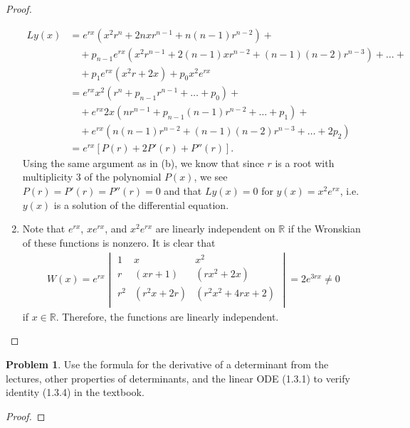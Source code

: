 \documentclass[12pt]{article}
\theoremstyle{definition}
\newtheorem{problem}{Problem}
\begin{document}
\begin{proof}
\begin{enumerate}
\begin{align*}
        Ly(x) &= e^{rx}\left(x^2r^n + 2nxr^{n-1} + n(n-1)r^{n-2}\right) +\\
        &\quad+ p_{n-1}e^{rx}\left(x^2r^{n-1} + 2(n-1)xr^{n-2} + (n-1)(n-2)r^{n-3}\right) + \dots +\\
        &\quad+ p_1 e^{rx}(x^2r+2x) + p_0 x^2e^{rx} \\
        &= e^{rx}x^2(r^n + p_{n-1}r^{n-1} +\dots + p_0) + \\
        &\quad + e^{rx}2x(nr^{n-1} + p_{n-1}(n-1)r^{n-2} + \dots + p_1) + \\
        &\quad + e^{rx}(n(n-1)r^{n-2} + (n-1)(n-2)r^{n-3} + \dots + 2p_2) \\
        &= e^{rx}\left[P(r) + 2P'(r) + P''(r)\right].
      \end{align*}
      Using the same argument as in (b), we know that
      since $r$ is a root with multiplicity 3 of the polynomial $P(x)$, we
      see $P(r) = P'(r) = P''(r) = 0$ and that $Ly(x) = 0$ for $y(x) = x^2e^{rx}$, i.e.\
      $y(x)$ is a solution of the differential equation.
    \item Note that $e^{rx}$, $xe^{rx}$, and $x^2 e^{rx}$
      are linearly independent on $\mathbb{R}$ if the Wronskian of these functions is nonzero. It is clear that
      \begin{align*}
        W(x) =
        e^{rx}
        \begin{vmatrix}
          1 & x & x^2  \\
          r & (xr + 1) &  (rx^2 + 2x) \\
          r^2 & (r^2x + 2r) & (r^2x^2 + 4rx + 2)  \\
        \end{vmatrix} = 2e^{3rx} \neq 0
      \end{align*}
      if $x \in \mathbb{R}$. Therefore, the functions are linearly independent.
  \end{enumerate}
\end{proof}
\newpage


\begin{problem}
  Use the formula for the derivative of a determinant from the lectures, other
  properties of determinants, and the linear ODE (1.3.1) to verify identity
  (1.3.4) in the textbook.
\end{problem}

\begin{proof}
\end{proof}
\end{document}
